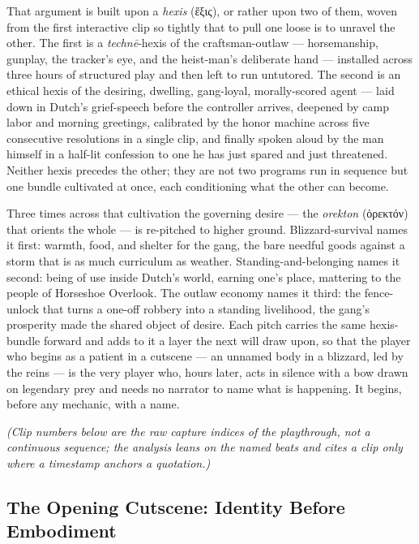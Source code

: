 \documentclass{article}
\newcommand{\gk}[1]{{\greekfont #1}}
\begin{document}
That argument is built upon a \textit{hexis} (\gk{ἕξις}), or rather upon two of them, woven from the first interactive clip so tightly that to pull one loose is to unravel the other. The first is a \textit{technē}-hexis of the craftsman-outlaw — horsemanship, gunplay, the tracker's eye, and the heist-man's deliberate hand — installed across three hours of structured play and then left to run untutored. The second is an ethical hexis of the desiring, dwelling, gang-loyal, morally-scored agent — laid down in Dutch's grief-speech before the controller arrives, deepened by camp labor and morning greetings, calibrated by the honor machine across five consecutive resolutions in a single clip, and finally spoken aloud by the man himself in a half-lit confession to one he has just spared and just threatened. Neither hexis precedes the other; they are not two programs run in sequence but one bundle cultivated at once, each conditioning what the other can become.

Three times across that cultivation the governing desire — the \textit{orekton} (\gk{ὀρεκτόν}) that orients the whole — is re-pitched to higher ground. Blizzard-survival names it first: warmth, food, and shelter for the gang, the bare needful goods against a storm that is as much curriculum as weather. Standing-and-belonging names it second: being of use inside Dutch's world, earning one's place, mattering to the people of Horseshoe Overlook. The outlaw economy names it third: the fence-unlock that turns a one-off robbery into a standing livelihood, the gang's prosperity made the shared object of desire. Each pitch carries the same hexis-bundle forward and adds to it a layer the next will draw upon, so that the player who begins as a patient in a cutscene — an unnamed body in a blizzard, led by the reins — is the very player who, hours later, acts in silence with a bow drawn on legendary prey and needs no narrator to name what is happening. It begins, before any mechanic, with a name.

\textit{(Clip numbers below are the raw capture indices of the playthrough, not a continuous sequence; the analysis leans on the named beats and cites a clip only where a timestamp anchors a quotation.)}

\bigskip

\subsection*{The Opening Cutscene: Identity Before Embodiment}
\end{document}
